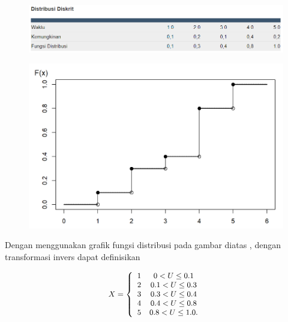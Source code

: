 \documentclass[
]{book}
\begin{document}
\begin{figure}

{\centering \includegraphics[width=1\linewidth]{images/6.1.2-4} 

}

\end{figure}

\begin{figure}

{\centering \includegraphics[width=1\linewidth]{images/6.1.2-5} 

}

\end{figure}

Dengan menggunakan grafik fungsi distribusi pada gambar diatas , dengan transformasi invers dapat definisikan

\[\small{
\begin{aligned}
X = \left\{ \begin{array}{cc}
              1 &   0<U  \leq 0.1  \\
              2 &  0.1 < U  \leq  0.3\\
              3 &  0.3 < U  \leq  0.4\\
              4 &  0.4 < U  \leq  0.8  \\
              5 &  0.8 < U  \leq  1.0     .
            \end{array} \right.
\end{aligned}
}\]
\end{document}

